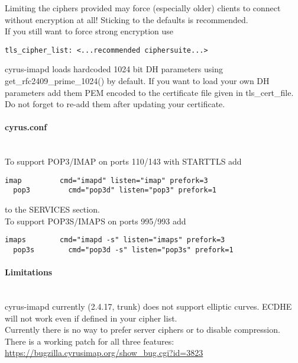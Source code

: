 Limiting the ciphers provided may force (especially older) clients to connect without encryption at all! Sticking to the defaults is recommended.\\

If you still want to force strong encryption use
\begin{lstlisting}[breaklines]
  tls_cipher_list: <...recommended ciphersuite...>
\end{lstlisting}

cyrus-imapd loads hardcoded 1024 bit DH parameters using get\_rfc2409\_prime\_1024() by default. If you want to load your own DH parameters add them PEM encoded to the certificate file given in tls\_cert\_file. Do not forget to re-add them after updating your certificate.

\paragraph*{cyrus.conf}\mbox{}\\

To support POP3/IMAP on ports 110/143 with STARTTLS add
\begin{lstlisting}[breaklines]
  imap         cmd="imapd" listen="imap" prefork=3
  pop3         cmd="pop3d" listen="pop3" prefork=1
\end{lstlisting}
to the SERVICES section.\\

To support POP3S/IMAPS on ports 995/993 add
\begin{lstlisting}[breaklines]
  imaps        cmd="imapd -s" listen="imaps" prefork=3
  pop3s        cmd="pop3d -s" listen="pop3s" prefork=1
\end{lstlisting}

\paragraph*{Limitations}\mbox{}\\

cyrus-imapd currently (2.4.17, trunk) does not support elliptic curves. ECDHE will not work even if defined in your cipher list.\\

Currently there is no way to prefer server ciphers or to disable compression.\\

There is a working patch for all three features:
\url{https://bugzilla.cyrusimap.org/show_bug.cgi?id=3823}\\

